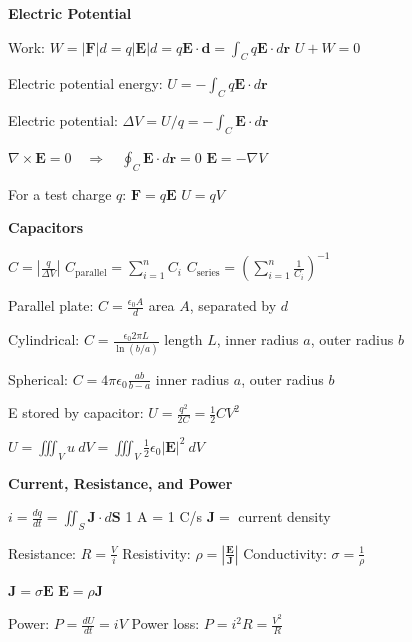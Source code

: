 \documentclass[twocolumn]{article}
\begin{document}
\vspace{-.5em}
\dotfill

\textbf{Electric Potential}

Work: $W = |\mathbf{F}|d = q|\mathbf{E}|d = q \mathbf{E} \cdot \mathbf{d} = \int_C q \mathbf{E} \cdot d\mathbf{r}$ \hfill $U + W = 0$

Electric potential energy: $U = -\int_C q \mathbf{E} \cdot d\mathbf{r}$

Electric potential: $\Delta V = U/q = -\int_C \mathbf{E} \cdot d\mathbf{r}$

$\nabla \times \mathbf{E} = 0 \quad \Longrightarrow \quad \oint_C \mathbf{E} \cdot d\mathbf{r} = 0$ \hfill $\mathbf{E} = - \nabla V$

For a test charge $q$: \hfill $\mathbf{F} = q \mathbf{E}$ \hfill $U = qV$

\vspace{-.5em}
\dotfill

\textbf{Capacitors}

$C = \left| \frac{q}{\Delta V} \right|$ \hfill $C_{\text{parallel}} = \sum_{i=1}^n C_i$ \hfill $C_{\text{series}} = \left( \sum_{i=1}^n \frac{1}{C_i} \right)^{-1}$

Parallel plate: $C = \frac{\epsilon_0 A}{d}$ \hfill area $A$, separated by $d$

Cylindrical: $C = \frac{\epsilon_0 2 \pi L}{\ln(b/a)}$ \hfill length $L$, inner radius $a$, outer radius $b$

Spherical: $C = 4 \pi \epsilon_0 \frac{ab}{b-a}$ \hfill inner radius $a$, outer radius $b$

E stored by capacitor: $U = \frac{q^2}{2C} = \frac{1}{2} CV^2$

$U = \iiint_V u\ dV = \iiint_V \frac{1}{2} \epsilon_0 |\mathbf{E}|^2\ dV$


\newpage


\textbf{Current, Resistance, and Power}

$i = \frac{dq}{dt} = \iint_S \mathbf{J} \cdot d\mathbf{S}$ \hfill 1 A = 1 C/s \hfill $\mathbf{J} =$ current density

Resistance: $R = \frac{V}{i}$ \hfill Resistivity: $\rho = \left| \frac{\mathbf{E}}{\mathbf{J}} \right|$ \hfill Conductivity: $\sigma = \frac{1}{\rho}$

$\mathbf{J} = \sigma \mathbf{E}$ \hfill $\mathbf{E} = \rho \mathbf{J}$

Power: $P = \frac{dU}{dt} = iV$ \hfill Power loss: $P = i^2 R = \frac{V^2}{R}$

\dotfill
\end{document}

